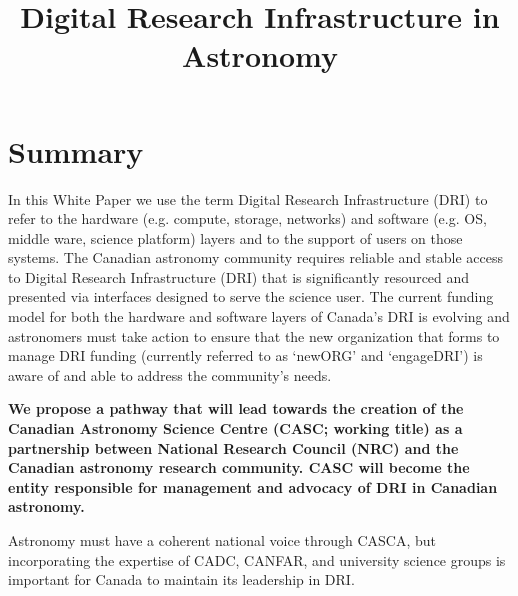 \documentclass[11pt]{article}
\begin{document}

%
\setlength{\bibsep}{0.0pt}
\author{}
\title{Digital Research Infrastructure in Astronomy}
\maketitle
\section{Summary}
In this White Paper we use the term Digital Research Infrastructure (DRI) to refer to the hardware (e.g. compute, storage, networks) and software (e.g. OS, middle ware, science platform) layers and to the support of users on those systems. 
The Canadian astronomy community requires reliable and stable access to Digital Research Infrastructure (DRI) that is significantly resourced and presented via interfaces designed to serve the science user.
The current funding model for both the hardware and software layers of Canada's DRI is evolving and astronomers must take action to ensure that the new organization that forms to manage DRI funding (currently referred to as `newORG' and `engageDRI') is aware of and able to address the community's needs.

{\bf We propose a pathway that will lead towards the creation of the Canadian Astronomy Science Centre (CASC; working title) as a partnership between National Research Council (NRC) and the Canadian astronomy research community.  CASC will become the entity responsible for management and advocacy of DRI in Canadian astronomy. }

Astronomy must have a coherent national voice through CASCA, but incorporating the expertise of CADC, CANFAR, and university science groups is important for Canada to maintain its leadership in DRI.
\end{document}
